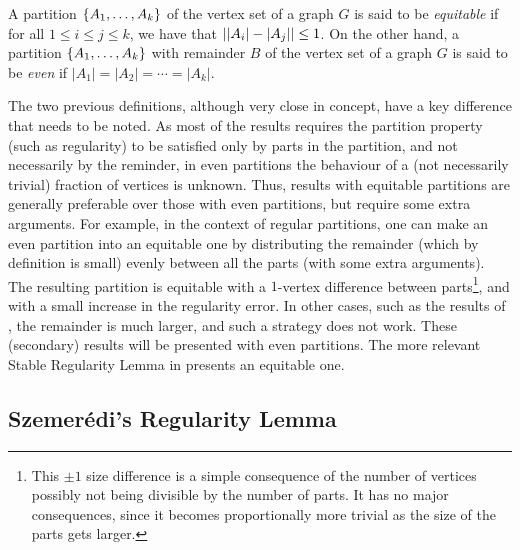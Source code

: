         \begin{definition} \label{def:even_and_equitable}
            A partition $\{ A_1, \ldots, A_k \}$ of the vertex set of a graph $G$ is said to be \emph{equitable}
            if for all $1 \leq i \leq j \leq k$, we have that $| |A_i| - |A_j| | \leq 1$.
            On the other hand, a partition $\{ A_1, \ldots, A_k \}$ with remainder $B$ of the vertex set of a graph $G$
            is said to be \emph{even} if $|A_1| = |A_2| = \cdots = |A_k|$.
        \end{definition}

        \begin{remark}
            The two previous definitions, although very close in concept, have a key difference that needs to be noted.
            As most of the results requires the partition property (such as regularity) to be satisfied only by parts
            in the partition, and not necessarily by the reminder, in even partitions the behaviour of a
            (not necessarily trivial) fraction of vertices is unknown.
            Thus, results with equitable partitions are generally preferable over those with even partitions, but
            require some extra arguments.
            For example, in the context of regular partitions,
            one can make an even partition into an equitable one by distributing the remainder (which by definition
            is small) evenly between all the parts (with some extra arguments).
            The resulting partition is equitable with a $1$-vertex difference between parts\footnote{
                This $\pm 1$ size difference is a simple consequence of the number of vertices possibly not being
                divisible by the number of parts.
                It has no major consequences, since it becomes proportionally more trivial as the size
                of the parts gets larger.}, and with a small increase in the regularity error.
            In other cases, such as the results of , the remainder is much larger, and
            such a strategy does not work.
            These (secondary) results will be presented with even partitions.
            The more relevant Stable Regularity Lemma in  presents an equitable one.
        \end{remark}

    \subsection{Szemerédi's Regularity Lemma} \label{subsec:subsection_2.3}

